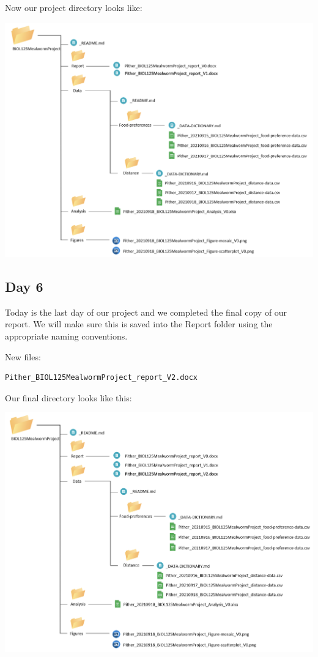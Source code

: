 \documentclass[
]{book}
\begin{document}
Now our project directory looks like:

\includegraphics{images/DS_directory-example-4.png}

\hypertarget{day-6-1}{%
\subsection*{Day 6}\label{day-6-1}}

Today is the last day of our project and we completed the final copy of our report. We will make sure this is saved into the Report folder using the appropriate naming conventions.

New files:

\begin{verbatim}
Pither_BIOL125MealwormProject_report_V2.docx
\end{verbatim}

Our final directory looks like this:

\includegraphics{images/DS_directory-example-5.png}
\end{document}
